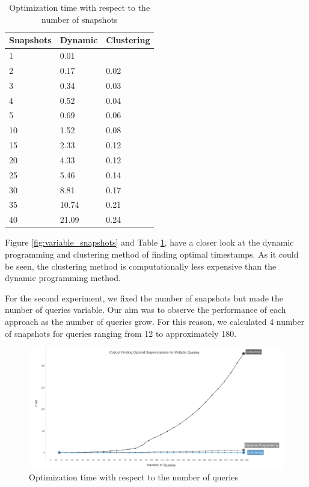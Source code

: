 \begin{center}
\begin{table}
	\centering
	\caption{Optimization time with respect to the number of snapshots}
	\label {table:variable_snapshots_2}
	\begin{tabular}{p{2cm}p{3cm}p{3cm}}
		\hline
		Snapshots  & Dynamic  & Clustering \\ \hline
		1 &   0.01  \\  
		2 &  0.17  & 0.02  \\
		3 &  0.34  & 0.03  \\
		4 & 0.52  & 0.04  \\
		5 &  0.69  & 0.06 \\
		10 &  1.52  & 0.08  \\
		15 & 2.33  & 0.12  \\ 
		20 & 4.33  & 0.12  \\ 
		25 & 5.46  & 0.14  \\ 
		30 & 8.81  & 0.17  \\
		35 & 10.74  & 0.21  \\
		40 & 21.09  & 0.24  \\\hline
	\end{tabular}
\end{table}
\end{center}
Figure \ref{fig:variable_snapshots} and Table \ref{table:variable_snapshots_2}, have a closer look at the dynamic programming and clustering method of finding optimal timestamps. As it could be seen, the clustering method is computationally less expensive than the dynamic programming method.

For the second experiment, we fixed the number of snapshots but made the number of queries variable. Our aim was to observe the performance of each approach as the number of queries grow. For this reason, we calculated 4 number of snapshots for queries ranging from 12 to approximately 180. 

\begin{figure}
	\centering
	\includegraphics[width=\textwidth]{figs/multi_query.jpg}
	\caption{Optimization time with respect to the number of queries}
	\label{fig:variable_queries}
\end{figure} 


